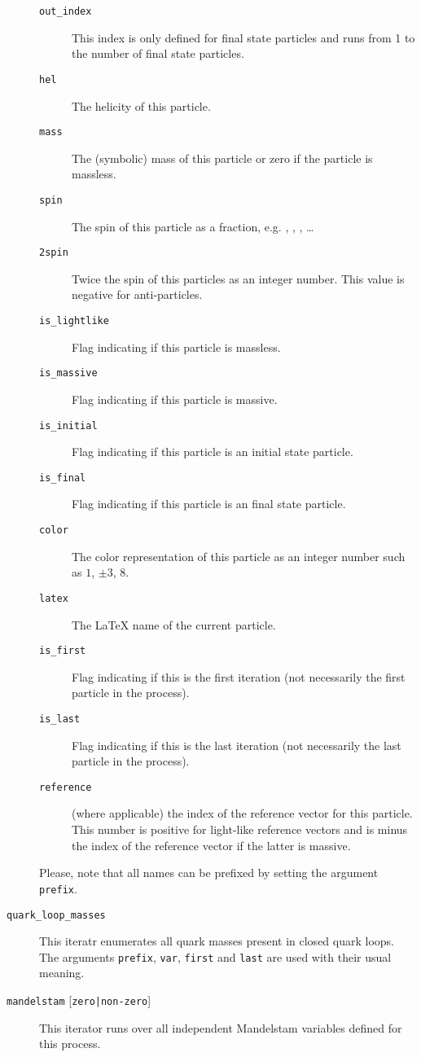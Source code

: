 \documentclass[11pt,a4paper]{refrep}
\begin{document}
\begin{description}
\begin{description}
   \item[\texttt{out\_index}] This index is only defined for final state
       particles and runs from 1 to the number of final state particles.
   \item[\texttt{hel}] The helicity of this particle.
   \item[\texttt{mass}] The (symbolic) mass of this particle or zero
       if the particle is massless.
   \item[\texttt{spin}] The spin of this particle as a fraction, e.g.
      , , , \dots
   \item[\texttt{2spin}] Twice the spin of this particles as an integer
      number. This value is negative for anti-particles.
   \item[\texttt{is\_lightlike}] Flag indicating if this particle is massless.
   \item[\texttt{is\_massive}] Flag indicating if this particle is massive.
   \item[\texttt{is\_initial}] Flag indicating if this particle is an
      initial state particle.
   \item[\texttt{is\_final}] Flag indicating if this particle is an
      final state particle.
   \item[\texttt{color}] The color representation of this particle
      as an integer number such as $1$, $\pm3$, $8$.
   \item[\texttt{latex}] The \LaTeX{} name of the current particle.
   \item[\texttt{is\_first}] Flag indicating if this is the first
      iteration (not necessarily the first particle in the process).
   \item[\texttt{is\_last}] Flag indicating if this is the last
      iteration (not necessarily the last particle in the process).
   \item[\texttt{reference}] (where applicable) the index of the reference
      vector for this particle. This number is positive for light-like
      reference vectors and is minus the index of the reference vector
      if the latter is massive.
   \end{description}

   Please, note that all names can be prefixed by setting the argument
   \texttt{prefix}.
\item[\texttt{quark\_loop\_masses}] This iteratr enumerates all
   quark masses present in closed quark loops. The arguments
   \texttt{prefix}, \texttt{var}, \texttt{first} and \texttt{last}
   are used with their usual meaning.
\item[\texttt{mandelstam}
   {[\texttt{zero|non-zero}]}]
   This iterator runs over all independent Mandelstam variables defined
   for this process.


\end{description}
\end{document}
